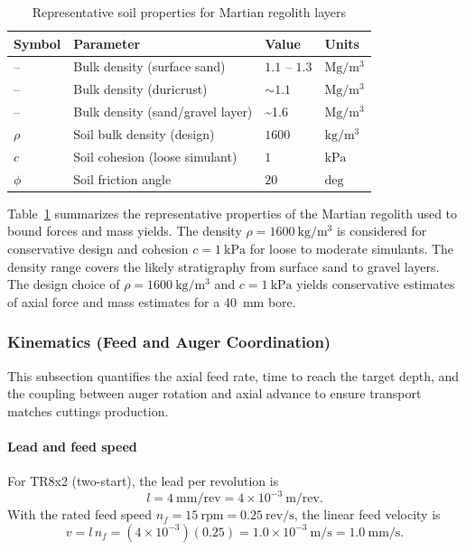 \documentclass[letterpaper, 10 pt, conference]{ieeeconf}  %
\begin{document}
\begin{table}[h!]
\centering
\caption{Representative soil properties for Martian regolith layers}
\label{tab:soil}
\begin{tabular}{@{}llll@{}}
\toprule
\textbf{Symbol} & \textbf{Parameter} & \textbf{Value} & \textbf{Units} \\
\midrule
-- & Bulk density (surface sand) & \(1.1\) -- \(1.3\) & \(\mathrm{Mg/m^{3}}\) \\
-- & Bulk density (duricrust) & \(\sim 1.1\) & \(\mathrm{Mg/m^{3}}\) \\
-- & Bulk density (sand/gravel layer) & \sim 1.6 & \(\mathrm{Mg/m^{3}}\) \\
\(\rho\) & Soil bulk density (design) & \(1600\) & \(\mathrm{kg/m^{3}}\) \\
\(c\) & Soil cohesion (loose simulant) & \(1\) & \(\mathrm{kPa}\) \\
\(\phi\) & Soil friction angle & \(20\) & \(\mathrm{deg}\) \\
\bottomrule
\end{tabular}
\end{table}
Table~\ref{tab:soil} summarizes the representative properties of the Martian regolith used to bound forces and mass yields. The density \(\rho=1600~\mathrm{kg/m^3}\) is considered for conservative design and cohesion \(c=1~\mathrm{kPa}\) for loose to moderate simulants. The density range covers the likely stratigraphy from surface sand to gravel layers. The design choice of \(\rho=1600~\mathrm{kg/m^3}\) and \(c=1~\mathrm{kPa}\) yields conservative estimates of axial force and mass estimates for a 40~mm bore.


\subsubsection{Kinematics (Feed and Auger Coordination)}
This subsection quantifies the axial feed rate, time to reach the target depth, and the coupling between auger rotation and axial advance to ensure transport matches cuttings production.

\paragraph{Lead and feed speed}
For TR8x2 (two-start), the lead per revolution is
\begin{equation}
l = 4~\mathrm{mm/rev} = 4\times10^{-3}~\mathrm{m/rev}. \label{eq:lead}
\end{equation}
With the rated feed speed \(n_f=15~\mathrm{rpm}=0.25~\mathrm{rev/s}\), the linear feed velocity is
\begin{equation}
v = l\,n_f = (4\times10^{-3})(0.25) = 1.0\times10^{-3}~\mathrm{m/s} = 1.0~\mathrm{mm/s}. \label{eq:v}
\end{equation}
\end{document}
